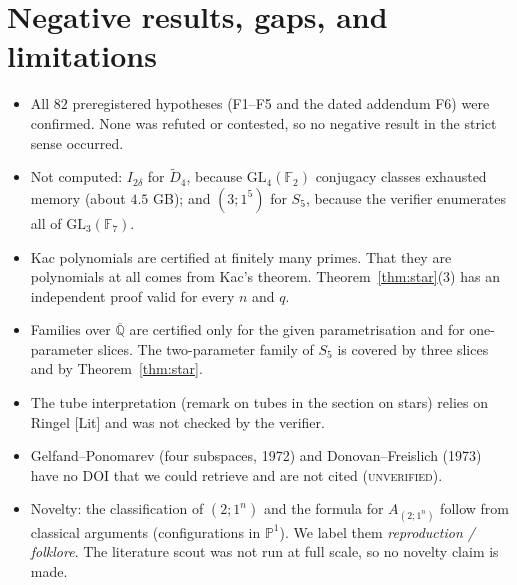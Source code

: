 \documentclass[11pt]{article}
\theoremstyle{definition}\newtheorem{definition}[theorem]{Definition}\newtheorem{remark}[theorem]{Remark}\newtheorem{observation}[theorem]{Numerical observation}
\begin{document}
\section{Negative results, gaps, and limitations}
\begin{itemize}
\item All $82$ preregistered hypotheses (F1--F5 and the dated addendum F6) were confirmed. None was refuted or contested, so no negative result in the strict sense occurred.
\item Not computed: $I_{2\delta}$ for $\widetilde D_4$, because $\mathrm{GL}_4(\mathbb F_2)$ conjugacy classes exhausted memory (about $4.5$ GB); and $(3;1^5)$ for $S_5$, because the verifier enumerates
all of $\mathrm{GL}_3(\mathbb F_7)$.
\item Kac polynomials are certified at finitely many primes. That they are polynomials at all comes from Kac's theorem. Theorem~\ref{thm:star}(3) has an
independent proof valid for every $n$ and $q$.
\item Families over $\overline{\mathbb Q}$ are certified only for the given parametrisation and for one-parameter slices. The two-parameter family of $S_5$ is covered by three slices
and by Theorem~\ref{thm:star}.
\item The tube interpretation (remark on tubes in the section on stars) relies on Ringel [Lit] and was not checked by the verifier.
\item Gelfand--Ponomarev (four subspaces, 1972) and Donovan--Freislich (1973) have no DOI that we could retrieve and are not cited (\textsc{unverified}).
\item Novelty: the classification of $(2;1^n)$ and the formula for $A_{(2;1^n)}$ follow from classical arguments (configurations in $\mathbb P^1$).
We label them \emph{reproduction / folklore}. The literature scout was not run at full scale, so no novelty claim is made.
\end{itemize}

\appendix
\end{document}
